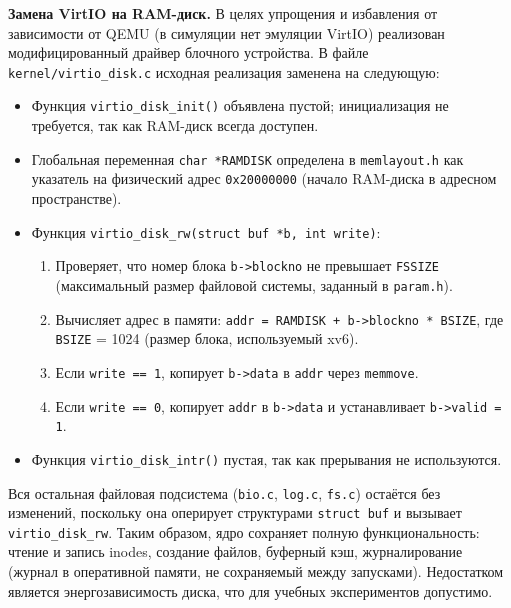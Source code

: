 \textbf{Замена VirtIO на RAM-диск.} В целях упрощения и избавления от зависимости от QEMU (в симуляции нет эмуляции VirtIO) реализован модифицированный драйвер блочного устройства. В файле \texttt{kernel/virtio\_disk.c} исходная реализация заменена на следующую:
\begin{itemize}
  \item Функция \texttt{virtio\_disk\_init()} объявлена пустой; инициализация не требуется, так как RAM-диск всегда доступен.
  \item Глобальная переменная \texttt{char *RAMDISK} определена в \texttt{memlayout.h} как указатель на физический адрес \texttt{0x20000000} (начало RAM-диска в адресном пространстве).
  \item Функция \texttt{virtio\_disk\_rw(struct buf *b, int write)}:
    \begin{enumerate}
      \item Проверяет, что номер блока \texttt{b->blockno} не превышает \texttt{FSSIZE} (максимальный размер файловой системы, заданный в \texttt{param.h}).
      \item Вычисляет адрес в памяти: \texttt{addr = RAMDISK + b->blockno * BSIZE}, где \texttt{BSIZE} = 1024 (размер блока, используемый xv6).
      \item Если \texttt{write == 1}, копирует \texttt{b->data} в \texttt{addr} через \texttt{memmove}.
      \item Если \texttt{write == 0}, копирует \texttt{addr} в \texttt{b->data} и устанавливает \texttt{b->valid = 1}.
    \end{enumerate}
  \item Функция \texttt{virtio\_disk\_intr()} пустая, так как прерывания не используются.
\end{itemize}
Вся остальная файловая подсистема (\texttt{bio.c}, \texttt{log.c}, \texttt{fs.c}) остаётся без изменений, поскольку она оперирует структурами \texttt{struct buf} и вызывает \texttt{virtio\_disk\_rw}. Таким образом, ядро сохраняет полную функциональность: чтение и запись inodes, создание файлов, буферный кэш, журналирование (журнал в оперативной памяти, не сохраняемый между запусками). Недостатком является энергозависимость диска, что для учебных экспериментов допустимо.

